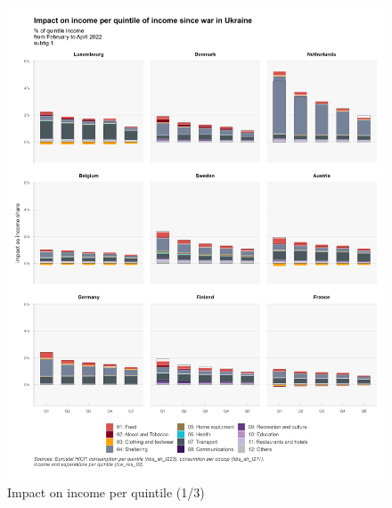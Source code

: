 \documentclass[
  9pt,
  a4paper,
  DIV=11,
  numbers=noendperiod,
  oneside]{scrartcl}
\begin{document}
\begin{figure}

\caption{Impact on income per quintile (1/3)}

{\centering \includegraphics[width=16cm,height=\textheight]{../svg/coicop_l1_wiu_1.png}

}

\end{figure}
\end{document}
